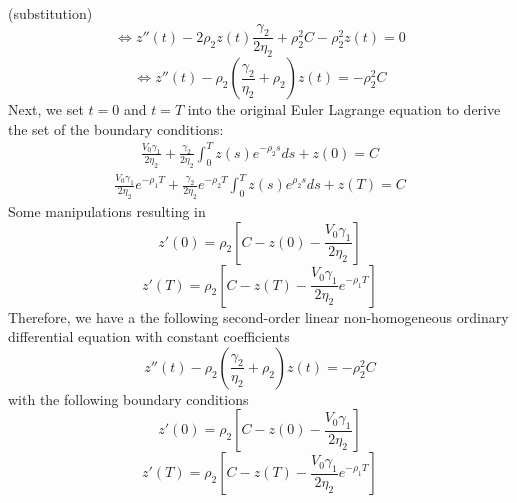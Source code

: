 \documentclass{article}
\begin{document}
(substitution)
\[
\Leftrightarrow z{''}(t) - 2 \rho_2 z(t) \frac{\gamma_2}{2 \eta_2} + \rho_2^2 C - \rho_2^2 z(t) = 0
\]
\[
\Leftrightarrow z{''}(t)  - \rho_2\left(\frac{\gamma_2}{\eta_2} + \rho_2 \right) z(t) = -\rho_2^2 C
\]
Next, we set $t=0$ and $t=T$ into the original Euler Lagrange equation to derive the set of the boundary conditions:
\[
\begin{aligned}
\frac{V_0 \gamma_1}{2 \eta_2} + \frac{\gamma_2}{2 \eta_2} \int_0^T  z(s) e^{-\rho_2 s} ds + z(0) = C
\end{aligned}
\]
\[
\begin{aligned}
\frac{V_0 \gamma_1}{2 \eta_2} e^{-\rho_1 T} + \frac{\gamma_2}{2 \eta_2} e^{-\rho_2 T}\int_0^T  z(s) e^{\rho_2 s} ds + z(T) = C
\end{aligned}
\]
Some manipulations resulting in 
\[
z'(0) = \rho_2 \left[C - z(0) - \frac{V_0 \gamma_1}{2 \eta_2} \right]
\]
\[
z'(T) = \rho_2 \left[C - z(T) - \frac{V_0 \gamma_1}{2 \eta_2} e^{-\rho_1 T}\right]
\]
Therefore, we have a the following second-order linear non-homogeneous ordinary differential equation with constant coefficients
\begin{equation}\label{ode_for_all_cond}
z{''}(t)  - \rho_2\left(\frac{\gamma_2}{\eta_2} + \rho_2 \right) z(t) = -\rho_2^2 C
\end{equation}
with the following boundary conditions
\begin{equation}\label{ode_boundary_cond_1}
z'(0) = \rho_2 \left[C - z(0) - \frac{V_0 \gamma_1}{2 \eta_2} \right]
\end{equation}
\begin{equation}\label{ode_boundary_cond_2}
z'(T) = \rho_2 \left[C - z(T) - \frac{V_0 \gamma_1}{2 \eta_2} e^{-\rho_1 T}\right]
\end{equation}
\end{document}
